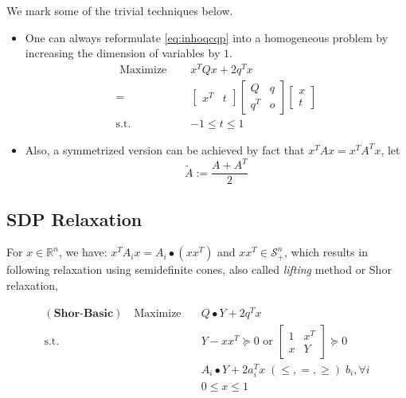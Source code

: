 \documentclass[../main]{subfiles}
\begin{document}
We mark some of the trivial techniques below.
\begin{itemize}
  \item One can always reformulate \eqref{eq:inhoqcqp} into a homogeneous problem by increasing the dimension of variables by \(1\).
        \begin{equation}
          \begin{aligned}
            \textrm { Maximize } \quad & x^{T} Q x  + 2q^Tx        \\
            =                          & \begin{bmatrix}x^T & t\end{bmatrix}
            \begin{bmatrix} Q   & q \\ q^T & o \end{bmatrix}
            \begin{bmatrix} x \\ t\end{bmatrix}                              \\
            \mathrm{s.t.} \quad        & - 1\le t \le 1
          \end{aligned}
        \end{equation}
  \item Also, a symmetrized version can be achieved by fact that \(x^TAx = x^TA^Tx\), let
        \begin{equation}
          \tilde A := \frac{A+A^T}{2}
        \end{equation}
\end{itemize}




\subsection{SDP Relaxation}
For \(x \in \mathbb{R}^{n}\), we have: \(x^{T} A_{i} x = A_i \bullet (xx^T)\) and \(xx^T \in \mathcal{S}^n_{+}\), which results in following relaxation using semidefinite cones, also called \textit{lifting} method or Shor relaxation,

\begin{equation}\label{eq:shor_basic}
  \begin{aligned}
    (\textbf{Shor-Basic})\quad \mathrm{Maximize}\quad & Q\bullet Y   + 2q^T x                                            \\
    \mathrm{s.t.}  \quad                              & Y-xx^T \succeq 0 \text { or }\begin{bmatrix} 1 & x^{T} \\ x & Y \end{bmatrix} \succeq 0 \\
                                                      & A_i \bullet Y +2 a_i^Tx \; (\le, =, \ge) \; b_i, \forall i       \\
                                                      & 0\le x\le 1
  \end{aligned}
\end{equation}
\end{document}
